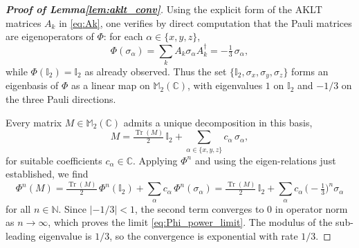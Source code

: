 \documentclass[11pt,a4paper]{article}
\begin{document}
\begin{proof}[\textbf{Proof of Lemma\ref{lem:aklt_conv}}]
Using the explicit form of the AKLT matrices $A_k$ in \eqref{eq:Ak}, one verifies by direct computation that the Pauli matrices are eigenoperators of $\Phi$: for each $\alpha\in\{x,y,z\}$,
\[
\Phi(\sigma_\alpha)
=
\sum_k A_k \sigma_\alpha A_k^{\dagger}
=
-\tfrac{1}{3}\,\sigma_\alpha,
\]
while $\Phi(\mathbb{I}_2)=\mathbb{I}_2$ as already observed. Thus the set $\{\mathbb{I}_2,\sigma_x,\sigma_y,\sigma_z\}$ forms an eigenbasis of $\Phi$ as a linear map on $\mathbb{M}_2(\mathbb{C})$, with eigenvalues $1$ on $\mathbb{I}_2$ and $-1/3$ on the three Pauli directions.

Every matrix $M\in\mathbb{M}_2(\mathbb{C})$ admits a unique decomposition in this basis,
\[
M
=
\tfrac{\operatorname{Tr}(M)}{2}\,\mathbb{I}_2
+
\sum_{\alpha\in\{x,y,z\}} c_{\alpha}\,\sigma_{\alpha},
\]
for suitable coefficients $c_{\alpha}\in\mathbb{C}$. Applying $\Phi^{n}$ and using the eigen-relations just established, we find
\[
\Phi^{n}(M)
=
\tfrac{\operatorname{Tr}(M)}{2}\,\Phi^{n}(\mathbb{I}_2)
+
\sum_{\alpha} c_{\alpha}\,\Phi^{n}(\sigma_{\alpha})
=
\tfrac{\operatorname{Tr}(M)}{2}\,\mathbb{I}_2
+
\sum_{\alpha} c_{\alpha}\,\bigl(-\tfrac{1}{3}\bigr)^{n}\sigma_{\alpha}
\]
for all $n\in\mathbb{N}$. Since $|-1/3|<1$, the second term converges to $0$ in operator norm as $n\to\infty$, which proves the limit \eqref{eq:Phi_power_limit}. The modulus of the sub-leading eigenvalue is $1/3$, so the convergence is exponential with rate $1/3$.
\end{proof}

\end{document}
